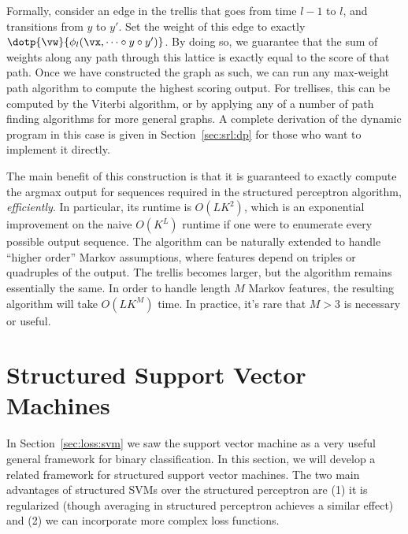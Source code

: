 Formally, consider an edge in the trellis that goes from time $l-1$ to $l$, and transitions from $y$ to $y'$.
Set the weight of this edge to exactly $\dotp{\vw}{\phi_l(\vx, \dots \circ y \circ y')}$.
By doing so, we guarantee that the sum of weights along any path through this lattice is exactly equal to the score of that path.
Once we have constructed the graph as such, we can run any max-weight path algorithm to compute the highest scoring output.
For trellises, this can be computed by the Viterbi algorithm, or by applying any of a number of path finding algorithms for more general graphs.
A complete derivation of the dynamic program in this case is given in Section~\ref{sec:srl:dp} for those who want to implement it directly.

The main benefit of this construction is that it is guaranteed to exactly compute the argmax output for sequences required in the structured perceptron algorithm, \emph{efficiently}.
In particular, its runtime is $O(LK^2)$, which is an exponential improvement on the naive $O(K^L)$ runtime if one were to enumerate every possible output sequence.
The algorithm can be naturally extended to handle ``higher order'' Markov assumptions, where features depend on triples or quadruples of the output.
The trellis becomes larger, but the algorithm remains essentially the same.
In order to handle length $M$ Markov features, the resulting algorithm will take $O(LK^M)$ time.
In practice, it's rare that $M>3$ is necessary or useful.





\section{Structured Support Vector Machines}

In Section~\ref{sec:loss:svm} we saw the support vector machine as a very useful general framework for binary classification.
In this section, we will develop a related framework for structured support vector machines.
The two main advantages of structured SVMs over the structured perceptron are (1) it is regularized (though averaging in structured perceptron achieves a similar effect) and (2) we can incorporate more complex loss functions.

